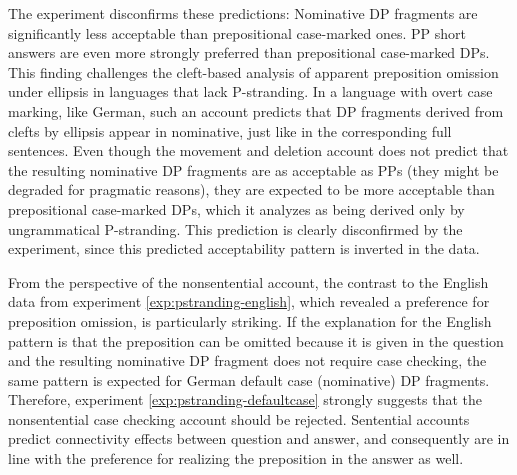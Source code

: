 The experiment disconfirms these predictions: Nominative DP fragments are significantly less acceptable than prepositional case-marked ones. PP short answers are even more strongly preferred than prepositional case-marked DPs. This finding challenges the cleft-based analysis of apparent preposition omission under ellipsis in languages that lack P-stranding. In a language with overt case marking, like German, such an account predicts that DP fragments derived from clefts by ellipsis appear in nominative, just like in the corresponding full sentences. Even though the movement and deletion account does not predict that the resulting nominative DP fragments are as acceptable as PPs (they might be degraded for pragmatic reasons), they are expected to be more acceptable than prepositional case-marked DPs, which it analyzes as being derived only by ungrammatical P-stranding. This prediction is clearly disconfirmed by the experiment, since this predicted acceptability pattern is inverted in the data.

From the perspective of the nonsentential account, the contrast to the English data from experiment \ref{exp:pstranding-english}, which revealed a preference for preposition omission, is particularly striking. If the explanation for the English pattern is that the preposition can be omitted because it is given in the question and the resulting nominative DP fragment does not require case checking, the same pattern is expected for German default case (nominative) DP fragments. Therefore, experiment \ref{exp:pstranding-defaultcase} strongly suggests that the nonsentential case checking account should be rejected. Sentential accounts predict connectivity effects between question and answer, and consequently are in line with the preference for realizing the preposition in the answer as well. 

